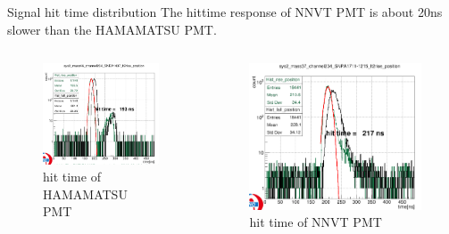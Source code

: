 \begin{frame}{Signal hit time distribution}
The hittime response of NNVT PMT is about 20ns slower than the HAMAMATSU PMT.
\begin{columns}
\begin{column}{.5\textwidth}
\begin{figure}
\centering
\includegraphics[width=\textwidth]{figures/riseposition.png} %
\caption{hit time of HAMAMATSU PMT}
\end{figure}
\end{column}
\begin{column}{.5\textwidth}
\begin{figure}
\centering
\includegraphics[width=\textwidth]{figures/hitpositionmcp.png} %
\caption{hit time of NNVT PMT}
\end{figure}
\end{column}
\end{columns}
\end{frame}
